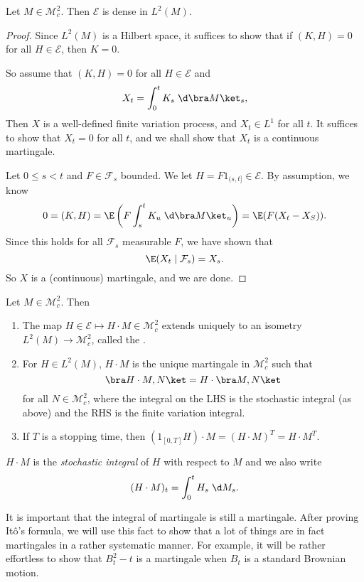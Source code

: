 \documentclass[a4paper]{article}
\begin{document}
\begin{prop}
  Let $M \in \mathcal{M}_c^2$. Then $\mathcal{E}$ is dense in $L^2(M)$.
\end{prop}

\begin{proof}
  Since $L^2(M)$ is a Hilbert space, it suffices to show that if $(K, H) = 0$ for all $H \in \mathcal{E}$, then $K = 0$.

  So assume that $(K, H) = 0$ for all $H \in \mathcal{E}$ and
  \[
    X_t = \int_0^t K_s \;\d \bra M\ket_s,
  \]
  Then $X$ is a well-defined finite variation process, and $X_t \in L^1$ for all $t$. It suffices to show that $X_t = 0$ for all $t$, and we shall show that $X_t$ is a continuous martingale.

  Let $0 \leq s < t$ and $F \in \mathcal{F}_s$ bounded. We let $H = F 1_{(s, t]} \in \mathcal{E}$. By assumption, we know
  \[
    0 = (K, H) = \E \left(F \int_s^t K_u\; \d \bra M\ket_u\right) = \E (F (X_t - X_S)).
  \]
  Since this holds for all $\mathcal{F}_s$ measurable $F$, we have shown that
  \[
    \E(X_t \mid \mathcal{F}_s) = X_s.
  \]
  So $X$ is a (continuous) martingale, and we are done.
\end{proof}

\begin{thm}
  Let $M \in \mathcal{M}_c^2$. Then
  \begin{enumerate}
    \item The map $H \in \mathcal{E} \mapsto H \cdot M \in \mathcal{M}_c^2$ extends uniquely to an isometry $L^2(M) \to \mathcal{M}^2_c$, called the .
    \item For $H \in L^2(M)$, $H \cdot M$ is the unique martingale in $\mathcal{M}_c^2$ such that
      \[
        \bra H \cdot M, N\ket = H \cdot \bra M, N\ket
      \]
      for all $N \in \mathcal{M}_c^2$, where the integral on the LHS is the stochastic integral (as above) and the RHS is the finite variation integral.
    \item If $T$ is a stopping time, then $(1_{[0, T]} H) \cdot M = (H \cdot M)^T = H \cdot M^T$.
  \end{enumerate}
\end{thm}

\begin{defi}
  $H \cdot M$ is the \emph{stochastic integral} of $H$ with respect to $M$ and we also write
  \[
    (H \cdot M)_t = \int_0^t H_s \;\d M_s.
  \]
\end{defi}
It is important that the integral of martingale is still a martingale. After proving It\^o's formula, we will use this fact to show that a lot of things are in fact martingales in a rather systematic manner. For example, it will be rather effortless to show that $B_t^2 - t$ is a martingale when $B_t$ is a standard Brownian motion.
\end{document}
